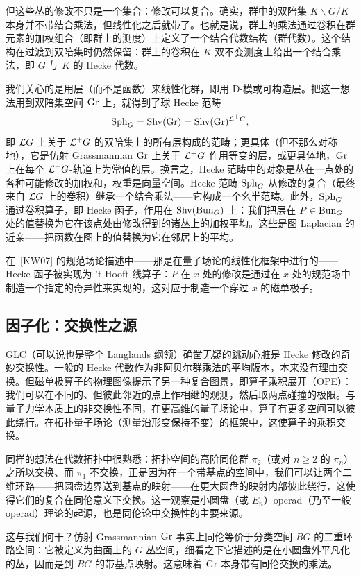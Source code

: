 但这些丛的修改不只是一个集合：修改可以复合。确实，群中的双陪集 $K\backslash G/K$ 本身并不带结合乘法，但线性化之后就带了。也就是说，群上的乘法通过卷积在群元素的加权组合（即群上的测度）上定义了一个结合代数结构（群代数）。这个结构在过渡到双陪集时仍然保留：群上的卷积在 $K$-双不变测度上给出一个结合乘法，即 $G$ 与 $K$ 的 Hecke 代数。

我们关心的是用层（而不是函数）来线性化群，即用 D-模或可构造层。把这一想法用到双陪集空间 $\operatorname{Gr}$ 上，就得到了球 Hecke 范畴
\[
\operatorname{Sph}_{G}=\operatorname{Shv}(\operatorname{Gr})=\operatorname{Shv}(\operatorname{Gr})^{\mathcal{L}^{+}G},
\]
即 $\mathcal{L}G$ 上关于 $\mathcal{L}^{+}G$ 的双陪集上的所有层构成的范畴；更具体（但不那么对称地），它是仿射 Grassmannian $\operatorname{Gr}$ 上关于 $\mathcal{L}^{+}G$ 作用等变的层，或更具体地，$\operatorname{Gr}$ 上在每个 $\mathcal{L}^{+}G$-轨道上为常值的层。换言之，Hecke 范畴中的对象是丛在一点处的各种可能修改的加权和，权重是向量空间。Hecke 范畴 $\operatorname{Sph}_{G}$ 从修改的复合（最终来自 $\mathcal{L}G$ 上的卷积）继承一个结合乘法——它构成一个幺半范畴。此外，$\operatorname{Sph}_{G}$ 通过卷积算子，即 Hecke 函子，作用在 $\operatorname{Shv}(\operatorname{Bun}_{G})$ 上：我们把层在 $P\in\operatorname{Bun}_{G}$ 处的值替换为它在该点处由修改得到的诸丛上的加权平均。这些是图 Laplacian 的近亲——把函数在图上的值替换为它在邻居上的平均。

在~[KW07] 的规范场论描述中——那是在量子场论的线性化框架中进行的——Hecke 函子被实现为 't Hooft 线算子：$P$ 在 $x$ 处的修改是通过在 $x$ 处的规范场中制造一个指定的奇异性来实现的，这对应于制造一个穿过 $x$ 的磁单极子。

\subsection{因子化：交换性之源}\label{sec:3.2}

GLC（可以说也是整个 Langlands 纲领）确凿无疑的跳动心脏是 Hecke 修改的奇妙交换性。一般的 Hecke 代数作为非阿贝尔群乘法的平均版本，本来没有理由交换。但磁单极算子的物理图像提示了另一种复合图景，即算子乘积展开（OPE）：我们可以在不同的、但彼此邻近的点上作相继的观测，然后取两点碰撞的极限。与量子力学本质上的非交换性不同，在更高维的量子场论中，算子有更多空间可以彼此绕行。在拓扑量子场论（测量沿形变保持不变）的框架中，这使算子的乘积交换。

同样的想法在代数拓扑中很熟悉：拓扑空间的高阶同伦群 $\pi_{2}$（或对 $n\ge2$ 的 $\pi_{n}$）之所以交换、而 $\pi_{1}$ 不交换，正是因为在一个带基点的空间中，我们可以让两个二维环路——把圆盘边界送到基点的映射——在更大圆盘的映射内部彼此绕行，这使得它们的复合在同伦意义下交换。这一观察是小圆盘（或 $E_{n}$）operad（乃至一般 operad）理论的起源，也是同伦论中交换性的主要来源。

这与我们何干？仿射 Grassmannian $\operatorname{Gr}$ 事实上同伦等价于分类空间 $BG$ 的二重环路空间：它被定义为曲面上的 $G$-丛空间，细看之下它描述的是在小圆盘外平凡化的丛，因而是到 $BG$ 的带基点映射。这意味着 $\operatorname{Gr}$ 本身带有同伦交换的乘法。

